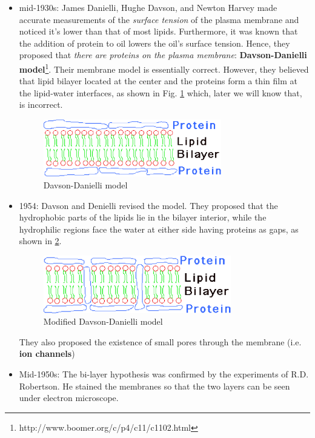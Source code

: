 \begin{itemize}
\item mid-1930s: James Danielli, Hughe Davson, and Newton Harvey made
  accurate measurements of the {\it surface tension} of the plasma
  membrane and noticed it's lower than that of most
  lipids. Furthermore, it was known that the addition of protein to
  oil lowers the oil's surface tension. Hence, they proposed that
  {\it there are proteins on the plasma membrane}:
  {\bf Davson-Danielli
    model}\footnote{http://www.boomer.org/c/p4/c11/c1102.html}.
  Their membrane model is essentially correct. However, they believed
  that lipid bilayer located at the center and the proteins form a
  thin film at the lipid-water interfaces, as shown in
  Fig. \ref{fig:membrane2} which, later we will know that, is
  incorrect.
  \begin{figure}[htb]
    \centerline{\includegraphics[height=2.5cm]{./images/bilayer-protein.eps}}
    \caption{Davson-Danielli model}\label{fig:membrane2}
  \end{figure}

\item 1954: Davson and Denielli revised the model. They proposed that
  the hydrophobic parts of the lipids lie in the bilayer interior,
  while the hydrophilic regions face the water at either side having
  proteins as gaps, as shown in \ref{fig:membrane3}.
  \begin{figure}[htb]
    \centerline{\includegraphics[height=2.5cm]{./images/bilayer-protein-modified.eps}}
    \caption{Modified Davson-Danielli model}\label{fig:membrane3}
  \end{figure}

  They also proposed the existence of small pores through the membrane
  (i.e. {\bf ion channels})
\item Mid-1950s: The bi-layer hypothesis was confirmed by the
  experiments of R.D. Robertson. He stained the membranes so that the
  two layers can be seen under electron microscope.


\end{itemize}
